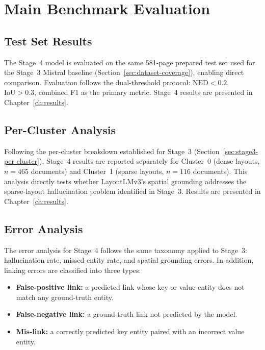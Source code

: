 \section{Main Benchmark Evaluation}
\label{sec:main-benchmark}

\subsection{Test Set Results}
\label{sec:test-set-results}

The Stage~4 model is evaluated on the same 581-page prepared test set used
for the Stage~3 Mistral baseline (Section~\ref{sec:dataset-coverage}), enabling
direct comparison. Evaluation follows the dual-threshold protocol:
$\text{NED} < 0.2$, $\text{IoU} > 0.3$, combined F1 as the primary metric.
Stage~4 results are presented in Chapter~\ref{ch:results}.


\subsection{Per-Cluster Analysis}
\label{sec:per-cluster-analysis}

Following the per-cluster breakdown established for Stage~3
(Section~\ref{sec:stage3-per-cluster}), Stage~4 results are reported
separately for Cluster~0 (dense layouts, $n = 465$ documents) and Cluster~1
(sparse layouts, $n = 116$ documents). This analysis directly tests whether
LayoutLMv3's spatial grounding addresses the sparse-layout hallucination
problem identified in Stage~3. Results are presented in
Chapter~\ref{ch:results}.

\subsection{Error Analysis}
\label{sec:stage4-error-analysis}

The error analysis for Stage~4 follows the same taxonomy applied to Stage~3:
hallucination rate, missed-entity rate, and spatial grounding errors.
In addition, linking errors are classified into three types:
\begin{itemize}
  \item \textbf{False-positive link:} a predicted link whose key or value
  entity does not match any ground-truth entity.
  \item \textbf{False-negative link:} a ground-truth link not predicted by
  the model.
  \item \textbf{Mis-link:} a correctly predicted key entity paired with
  an incorrect value entity.
\end{itemize}

